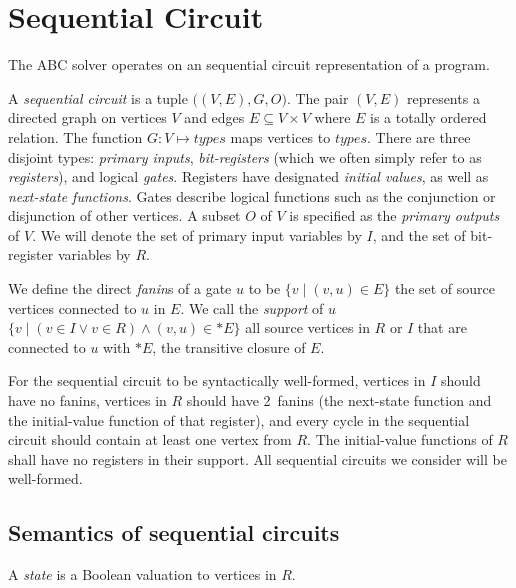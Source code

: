 \section{Sequential Circuit}
\label{sec:preliminaries}
The ABC solver operates on an sequential circuit representation of a program.
\begin{definition}
\rm A {\em sequential circuit} is a tuple $\big( (V, E),G,
O\big)$.  The pair $(V,E)$ represents a directed graph on
vertices $V$ and edges $E \subseteq V\times V$ where $E$
is a totally ordered relation.  The function $G: V \mapsto
{\mathit types}$ maps vertices to ${\mathit types}$.
There are three disjoint types: {\em primary inputs}, {\em
bit-registers} (which we often simply refer to as {\em
registers}), and logical {\em gates}.  Registers have designated
{\em initial values}, as well as {\em next-state
functions}.  Gates describe logical functions such as
the conjunction or disjunction of other vertices. 
A subset $O$ of $V$ is specified as the {\em
primary outputs} of $V$.  
We will denote the set of primary input variables by $I$,
and the set of bit-register variables by $R$.  
\label{def:back:seq_circuit}
\end{definition}

\begin{definition}[Fanins]
\rm We define the direct {\em fanin}s of a gate $u$ to be
$\{v \mid (v,u)\in E\}$ the set of source vertices connected
to $u$ in $E$.  We call the {\em support} of $u$ $\{v \mid
(v\in I \vee v \in R) \wedge (v,u) \in \ast E\}$ all
source vertices in $R$ or $I$ that are connected to $u$
with $\ast E$, the transitive closure of $E$.
\label{def:back:fanins} 
\end{definition}


For the sequential
circuit to be syntactically well-formed, vertices in $I$
should have no fanins, vertices in $R$ should have
2~fanins (the next-state function and the initial-value
function of that register), 
and every cycle in the sequential circuit should contain
at least one vertex from $R$.  
The initial-value functions
of $R$ shall have no registers in their support.  
All sequential circuits we consider will be well-formed.  

\subsection{Semantics of sequential circuits}
\label{s:back:crct_semantics}

\begin{definition}[State]
\rm A {\em state} is a Boolean valuation to vertices in $R$. 
\end{definition}

